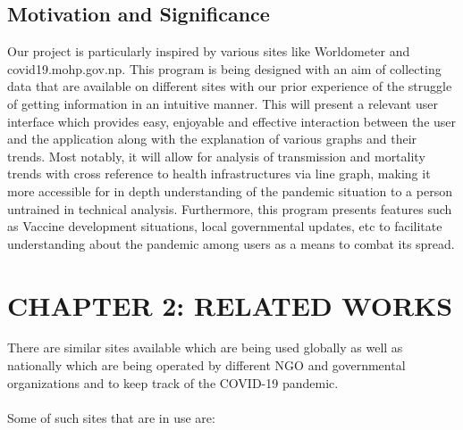 \documentclass[12pt]{article}
\begin{document}
\vspace*{5mm}
\subsection{Motivation and Significance}
Our project is particularly inspired by various sites like Worldometer and covid19.mohp.gov.np. This program is being designed with an aim of collecting data that 
are available on different sites with our prior experience of the struggle of getting information in an intuitive manner. This will present a relevant user interface 
which provides easy, enjoyable and effective interaction between the user and the application along with the explanation of various graphs and their trends. Most 
notably, it will allow for analysis of transmission and mortality trends with cross reference to health infrastructures via line graph, making it more accessible 
for in depth understanding of the pandemic situation to a person untrained in technical analysis. Furthermore, this program presents features such as Vaccine 
development situations, local governmental updates, etc to facilitate understanding about the pandemic among users as a means to combat its spread.

\clearpage

\section{CHAPTER 2: RELATED WORKS}
There are similar sites available which are being used globally as well as nationally which are being operated by different NGO and governmental organizations and 
to keep track of the COVID-19 pandemic.
\\\\
Some of such sites that are in use are:
\end{document}
